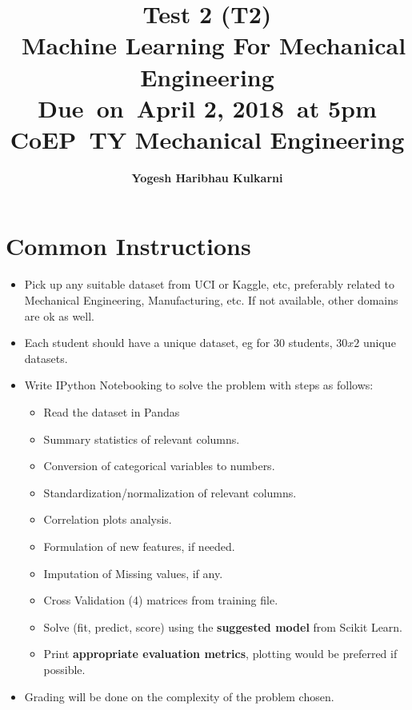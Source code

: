 



\newcommand{\hmwkTitle}{Machine Learning For Mechanical Engineering}
\newcommand{\hmwkDueDate}{April 2, 2018}
\newcommand{\hmwkClass}{Test 2 (T2)}
\newcommand{\hmwkClassTime}{TY Mechanical Engineering}
\newcommand{\hmwkClassInstructor}{CoEP}
\newcommand{\hmwkAuthorName}{\textbf{Yogesh Haribhau Kulkarni}}

\title{
    \textmd{\textbf{\hmwkClass\\\ \hmwkTitle}}\\
    {Due\ on\ \hmwkDueDate\ at 5pm}\\
    \vspace{0.1in}\large{{\hmwkClassInstructor\ \hmwkClassTime}}
}

\author{\hmwkAuthorName}
\date{}



\maketitle

\section{Common Instructions}
\begin{itemize}
\item Pick up any suitable dataset from UCI or Kaggle, etc, preferably related to Mechanical Engineering, Manufacturing, etc.  If not available, other domains are ok as well.
\item Each student should have a unique dataset, eg for 30 students, $30x2$ unique datasets.
\item Write IPython Notebooking to solve the problem with steps as follows:
\begin{itemize}
\item Read the dataset in Pandas
\item Summary statistics of relevant columns.
\item Conversion of categorical variables to numbers.
\item Standardization/normalization of relevant columns.
\item Correlation plots analysis.
\item Formulation of new features, if needed.
\item Imputation of Missing values, if any.
\item Cross Validation (4) matrices from training file.
\item Solve (fit, predict, score) using the \textbf{suggested model} from Scikit Learn.
\item Print \textbf{appropriate evaluation metrics}, plotting would be preferred if possible.
\end{itemize}
\item Grading will be done on the complexity of the problem chosen.
\end{itemize}

